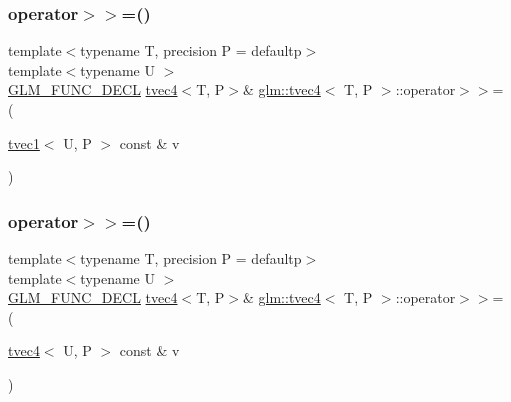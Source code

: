 \mbox{\label{structglm_1_1tvec4_a941c7db66248a949a46e398b8f9f15ce}} 
\subsubsection{\texorpdfstring{operator$>$$>$=()}{operator>>=()}\hspace{0.1cm}{\footnotesize\ttfamily [2/6]}}
{\footnotesize\ttfamily template$<$typename T, precision P = defaultp$>$ \\
template$<$typename U $>$ \\
\mbox{\hyperlink{setup_8hpp_ab2d052de21a70539923e9bcbf6e83a51}{G\+L\+M\+\_\+\+F\+U\+N\+C\+\_\+\+D\+E\+CL}} \mbox{\hyperlink{structglm_1_1tvec4}{tvec4}}$<$T, P$>$\& \mbox{\hyperlink{structglm_1_1tvec4}{glm\+::tvec4}}$<$ T, P $>$\+::operator$>$$>$= (\begin{DoxyParamCaption}\item[{\mbox{\hyperlink{structglm_1_1tvec1}{tvec1}}$<$ U, P $>$ const \&}]{v }\end{DoxyParamCaption})}

\mbox{\label{structglm_1_1tvec4_a36837fd895234f73e2e76aedb39712b2}} 
\subsubsection{\texorpdfstring{operator$>$$>$=()}{operator>>=()}\hspace{0.1cm}{\footnotesize\ttfamily [3/6]}}
{\footnotesize\ttfamily template$<$typename T, precision P = defaultp$>$ \\
template$<$typename U $>$ \\
\mbox{\hyperlink{setup_8hpp_ab2d052de21a70539923e9bcbf6e83a51}{G\+L\+M\+\_\+\+F\+U\+N\+C\+\_\+\+D\+E\+CL}} \mbox{\hyperlink{structglm_1_1tvec4}{tvec4}}$<$T, P$>$\& \mbox{\hyperlink{structglm_1_1tvec4}{glm\+::tvec4}}$<$ T, P $>$\+::operator$>$$>$= (\begin{DoxyParamCaption}\item[{\mbox{\hyperlink{structglm_1_1tvec4}{tvec4}}$<$ U, P $>$ const \&}]{v }\end{DoxyParamCaption})}

